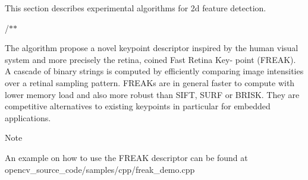 This section describes experimental algorithms for 2d feature detection. 

/$\ast$$\ast$

The algorithm propose a novel keypoint descriptor inspired by the human visual system and more precisely the retina, coined Fast Retina Key-\/ point (F\+R\+E\+AK). A cascade of binary strings is computed by efficiently comparing image intensities over a retinal sampling pattern. F\+R\+E\+A\+Ks are in general faster to compute with lower memory load and also more robust than S\+I\+FT, S\+U\+RF or B\+R\+I\+SK. They are competitive alternatives to existing keypoints in particular for embedded applications. 

\begin{DoxyNote}{Note}

\begin{DoxyItemize}
\item An example on how to use the F\+R\+E\+AK descriptor can be found at opencv\+\_\+source\+\_\+code/samples/cpp/freak\+\_\+demo.\+cpp 
\end{DoxyItemize}
\end{DoxyNote}

